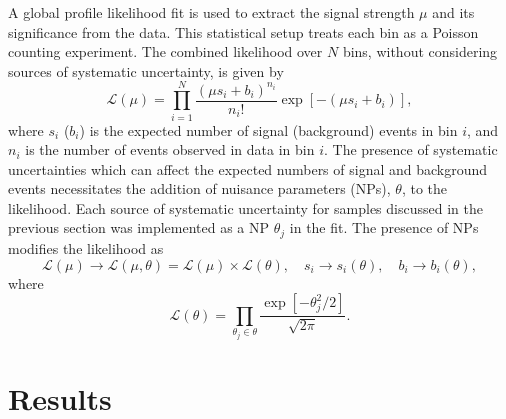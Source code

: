 A global profile likelihood fit is used to extract the signal strength $\mu$ and its significance from the data. This statistical setup treats each bin as a Poisson counting experiment. The combined likelihood over $N$ bins, without considering sources of systematic uncertainty, is given by
%
\begin{equation}
    \mathcal{L}(\mu) = \prod_{i=1}^N \frac{(\mu s_i + b_i)^{n_i}}{n_i!} \exp \left[ - (\mu s_i + b_i) \right],
\end{equation}
%
where $s_i$ ($b_i$) is the expected number of signal (background) events in bin $i$, and $n_i$ is the number of events observed in data in bin $i$. The presence of systematic uncertainties which can affect the expected numbers of signal and background events necessitates the addition of nuisance parameters (NPs), $\theta$, to the likelihood. Each source of systematic uncertainty for \Vjets samples discussed in the previous section was implemented as a NP $\theta_j$ in the fit. The presence of NPs modifies the likelihood as 
%
\begin{equation}
    \mathcal{L}(\mu) \rightarrow \mathcal{L}(\mu, \theta) = \mathcal{L}(\mu) \times \mathcal{L}(\theta) , \quad s_i \rightarrow s_i(\theta) , \quad b_i \rightarrow b_i(\theta),
\end{equation}
%
where
%
\begin{equation}
    \mathcal{L}(\theta) = \prod_{\theta_j \in \theta} \frac{\exp\left[{-\theta_j^2/2}\right]}{\sqrt{2\pi}}.
\end{equation}
%


\section{Results}\label{sec:vhbb_results}

